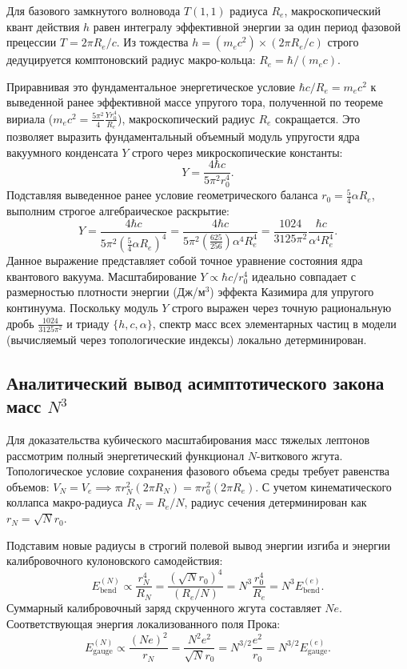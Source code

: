\documentclass[11pt,a4paper]{article}
\begin{document}
	Для базового замкнутого волновода $T(1,1)$ радиуса $R_e$, макроскопический квант действия $h$ равен интегралу эффективной энергии за один период фазовой прецессии $T = 2\pi R_e/c$. Из тождества $h = (m_e c^2) \times (2\pi R_e/c)$ строго дедуцируется комптоновский радиус макро-кольца: $R_e = \hbar / (m_e c)$. 
	
	Приравнивая это фундаментальное энергетическое условие $\hbar c / R_e = m_e c^2$ к выведенной ранее эффективной массе упругого тора, полученной по теореме вириала ($m_e c^2 = \frac{5\pi^2}{4} \frac{Y r_0^4}{R_e}$), макроскопический радиус $R_e$ сокращается. Это позволяет выразить фундаментальный объемный модуль упругости ядра вакуумного конденсата $Y$ строго через микроскопические константы:
	\begin{equation}
		Y = \frac{4 \hbar c}{5\pi^2 r_0^4}.
	\end{equation}
	Подставляя выведенное ранее условие геометрического баланса $r_0 = \frac{5}{4}\alpha R_e$, выполним строгое алгебраическое раскрытие:
	\begin{equation}
		Y = \frac{4 \hbar c}{5\pi^2 \left( \frac{5}{4}\alpha R_e \right)^4} = \frac{4 \hbar c}{5\pi^2 \left( \frac{625}{256} \right) \alpha^4 R_e^4} = \frac{1024}{3125 \pi^2} \frac{\hbar c}{\alpha^4 R_e^4}.
	\end{equation}
	Данное выражение представляет собой точное уравнение состояния ядра квантового вакуума. Масштабирование $Y \propto \hbar c / r_0^4$ идеально совпадает с размерностью плотности энергии (Дж/м$^3$) эффекта Казимира для упругого континуума. 
	Поскольку модуль $Y$ строго выражен через точную рациональную дробь $\frac{1024}{3125\pi^2}$ и триаду $\{h, c, \alpha\}$, спектр масс всех элементарных частиц в модели (вычисляемый через топологические индексы) локально детерминирован.
	
	\subsection{Аналитический вывод асимптотического закона масс $N^3$}
	Для доказательства кубического масштабирования масс тяжелых лептонов рассмотрим полный энергетический функционал $N$-виткового жгута. Топологическое условие сохранения фазового объема среды требует равенства объемов: $V_N = V_e \implies \pi r_N^2 (2\pi R_N) = \pi r_0^2 (2\pi R_e)$. С учетом кинематического коллапса макро-радиуса $R_N = R_e / N$, радиус сечения детерминирован как $r_N = \sqrt{N} r_0$.
	
	Подставим новые радиусы в строгий полевой вывод энергии изгиба и энергии калибровочного кулоновского самодействия:
	\begin{equation}
		E_{\text{bend}}^{(N)} \propto \frac{r_N^4}{R_N} = \frac{(\sqrt{N} r_0)^4}{(R_e / N)} = N^3 \frac{r_0^4}{R_e} = N^3 E_{\text{bend}}^{(e)}.
	\end{equation}
	Суммарный калибровочный заряд скрученного жгута составляет $N e$. Соответствующая энергия локализованного поля Прока:
	\begin{equation}
		E_{\text{gauge}}^{(N)} \propto \frac{(Ne)^2}{r_N} = \frac{N^2 e^2}{\sqrt{N} r_0} = N^{3/2} \frac{e^2}{r_0} = N^{3/2} E_{\text{gauge}}^{(e)}.
	\end{equation}
	
\end{document}
